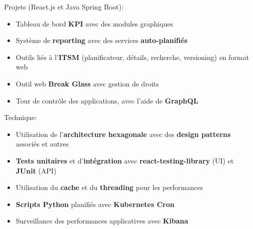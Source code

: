 \documentclass[10pt,a4paper,ragged2e,withhyper]{altacv}
\begin{document}


\makecvheader


\vspace{-.5\baselineskip}
\begin{minipage}[t]{0.45\textwidth}
  \vspace{0pt}
  Projets (React.js et Java Spring Boot):
  \begin{itemize}
    \item Tableau de bord \textbf{KPI} avec des modules graphiques
    \item Système de \textbf{reporting} avec des services \textbf{auto-planifiés}
    \item Outils liés à l'\textbf{ITSM} (planificateur, détails, recherche, versioning) en format web
    \item Outil web \textbf{Break Glass} avec gestion de droits
    \item Tour de contrôle des applications, avec l'aide de \textbf{GraphQL}
  \end{itemize}
\end{minipage}
\hfill
\begin{minipage}[t]{0.45\textwidth}
  \vspace{0pt}
  Technique:
  \begin{itemize}
    \item Utilisation de l'\textbf{architecture hexagonale} avec des \textbf{design patterns} associés et autres
    \item \textbf{Tests unitaires} et d'\textbf{intégration} avec \textbf{react-testing-library} (UI) et \textbf{JUnit} (API)
    \item Utilisation du \textbf{cache} et du \textbf{threading} pour les performances
    \item \textbf{Scripts Python} planifiés avec \textbf{Kubernetes Cron}
    \item Surveillance des performances applicatives avec \textbf{Kibana}
  \end{itemize}
\end{minipage}
\medskip
\end{document}

